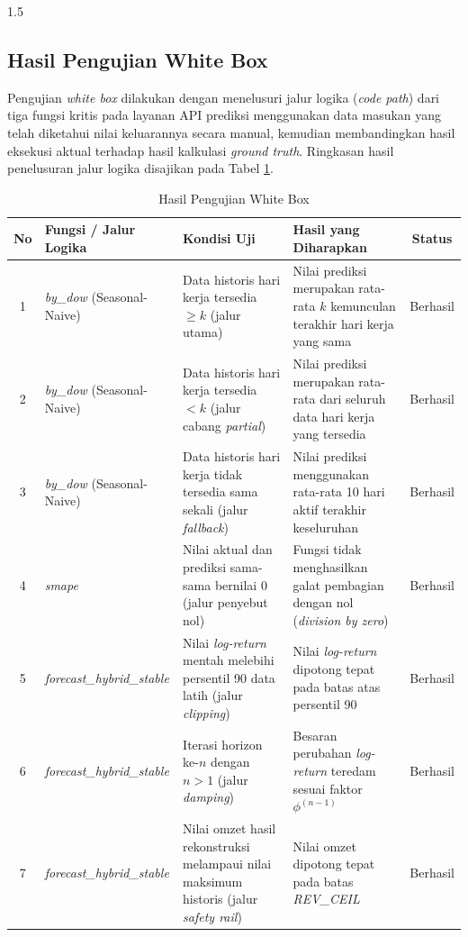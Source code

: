 \documentclass[12pt, a4paper, onecolumn, oneside]{report}
\begin{document}
\begin{spacing}{1.5}
\subsection{Hasil Pengujian White Box}

Pengujian \textit{white box} dilakukan dengan menelusuri jalur logika (\textit{code path}) dari tiga fungsi kritis pada layanan API prediksi menggunakan data masukan yang telah diketahui nilai keluarannya secara manual, kemudian membandingkan hasil eksekusi aktual terhadap hasil kalkulasi \textit{ground truth}. Ringkasan hasil penelusuran jalur logika disajikan pada Tabel \ref{tab:hasil_whitebox}.

\begin{table}[H]
\centering
\caption{Hasil Pengujian White Box}
\label{tab:hasil_whitebox}
\begin{tabularx}{\textwidth}{|c|X|X|X|c|}
\hline
\textbf{No} & \textbf{Fungsi / Jalur Logika} & \textbf{Kondisi Uji} & \textbf{Hasil yang Diharapkan} & \textbf{Status} \\
\hline
1 & \textit{by\_dow} (Seasonal-Naive) & Data historis hari kerja tersedia $\geq k$ (jalur utama) & Nilai prediksi merupakan rata-rata $k$ kemunculan terakhir hari kerja yang sama & Berhasil \\
\hline
2 & \textit{by\_dow} (Seasonal-Naive) & Data historis hari kerja tersedia $<k$ (jalur cabang \textit{partial}) & Nilai prediksi merupakan rata-rata dari seluruh data hari kerja yang tersedia & Berhasil \\
\hline
3 & \textit{by\_dow} (Seasonal-Naive) & Data historis hari kerja tidak tersedia sama sekali (jalur \textit{fallback}) & Nilai prediksi menggunakan rata-rata 10 hari aktif terakhir keseluruhan & Berhasil \\
\hline
4 & \textit{smape} & Nilai aktual dan prediksi sama-sama bernilai 0 (jalur penyebut nol) & Fungsi tidak menghasilkan galat pembagian dengan nol (\textit{division by zero}) & Berhasil \\
\hline
5 & {\small\textit{forecast\_hybrid\_\allowbreak stable}} & Nilai \textit{log-return} mentah melebihi persentil 90 data latih (jalur \textit{clipping}) & Nilai \textit{log-return} dipotong tepat pada batas atas persentil 90 & Berhasil \\
\hline
6 & {\small\textit{forecast\_hybrid\_\allowbreak stable}} & Iterasi horizon ke-$n$ dengan $n>1$ (jalur \textit{damping}) & Besaran perubahan \textit{log-return} teredam sesuai faktor $\phi^{(n-1)}$ & Berhasil \\
\hline
7 & {\small\textit{forecast\_hybrid\_\allowbreak stable}} & Nilai omzet hasil rekonstruksi melampaui nilai maksimum historis (jalur \textit{safety rail}) & Nilai omzet dipotong tepat pada batas \textit{REV\_CEIL} & Berhasil \\
\hline
\end{tabularx}
\end{table}


\end{spacing}
\end{document}
